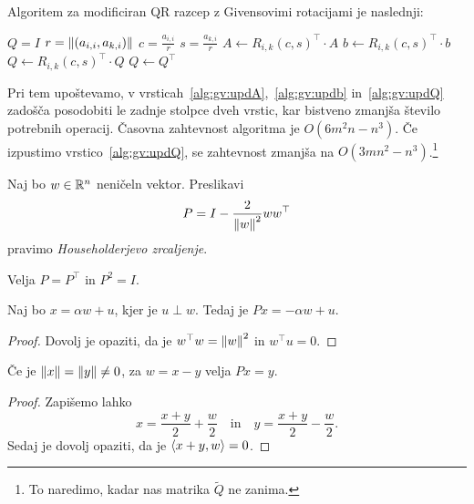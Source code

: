 \begin{opomba}
Algoritem za modificiran QR razcep z Givensovimi rotacijami je
naslednji:

\begin{algorithmic}[1]
\State $Q = I$
    \State $r = \left\lVert (a_{i,i}, a_{k,i})\right\rVert$
    \State $c = \frac{a_{i,i}}{r}$
    \State $s = \frac{a_{k,i}}{r}$
    \State $A \gets R_{i,k}(c,s)^\top \cdot A$
    \label{alg:gv:updA}
    \State $b \gets R_{i,k}(c,s)^\top \cdot b$
    \label{alg:gv:updb}
    \State $Q \gets R_{i,k}(c,s)^\top \cdot Q$
    \label{alg:gv:updQ}
  \EndFor
\EndFor
\State $Q \gets Q^\top$
\end{algorithmic}
Pri tem upoštevamo, v
vrsticah~\ref{alg:gv:updA},~\ref{alg:gv:updb} in~\ref{alg:gv:updQ}
zadošča posodobiti le zadnje stolpce dveh vrstic, kar bistveno
zmanjša število potrebnih operacij. Časovna zahtevnost algoritma je
$O(6m^2n - n^3)$. Če izpustimo vrstico~\ref{alg:gv:updQ}, se
zahtevnost zmanjša na $O(3mn^2 - n^3)$.\footnote{To naredimo, kadar
nas matrika $\widetilde{Q}$ ne zanima.}
\end{opomba}

\begin{definicija}
Naj bo $w \in \mathbb{R}^n$ neničeln vektor. Preslikavi
\[
P = I - \frac{2}{\left\lVert w\right\rVert^2} w w^\top
\]
pravimo
\emph{Householderjevo zrcaljenje}.
\end{definicija}

\begin{trditev}
Velja $P = P^\top$ in $P^2 = I$.
\end{trditev}

\obvs

\begin{trditev}
Naj bo $x = \alpha w + u$, kjer je $u \perp w$. Tedaj je
$Px = - \alpha w + u$.
\end{trditev}

\begin{proof}
Dovolj je opaziti, da je $w^\top w = \left\lVert w\right\rVert^2$ in $w^\top u = 0$.
\end{proof}

\begin{posledica}
Če je $\left\lVert x\right\rVert = \left\lVert y\right\rVert \ne 0$, za $w = x-y$ velja $Px = y$.
\end{posledica}

\begin{proof}
Zapišemo lahko
\[
x = \frac{x+y}{2} + \frac{w}{2}
\quad \text{in} \quad
y = \frac{x+y}{2} - \frac{w}{2}.
\]
Sedaj je dovolj opaziti, da je $\left\langle x+y,w\right\rangle = 0$.
\end{proof}

